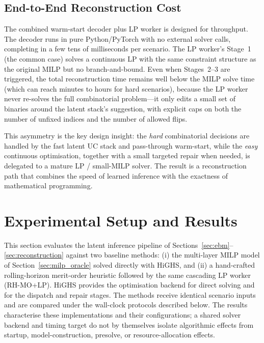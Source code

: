 \documentclass{article}
\begin{document}
\subsection{End-to-End Reconstruction Cost}
\label{sec:reconstruction_cost}

The combined warm-start decoder plus LP worker is designed for throughput. The decoder runs in pure Python/PyTorch with no external solver calls, completing in a few tens of milliseconds per scenario. The LP worker's Stage~1 (the common case) solves a continuous LP with the same constraint structure as the original MILP but no branch-and-bound. Even when Stages~2--3 are triggered, the total reconstruction time remains well below the MILP solve time (which can reach minutes to hours for hard scenarios), because the LP worker never re-solves the full combinatorial problem---it only edits a small set of binaries around the latent stack's suggestion, with explicit caps on both the number of unfixed indices and the number of allowed flips.

This asymmetry is the key design insight: the \emph{hard} combinatorial decisions are handled by the fast latent UC stack and pass-through warm-start, while the \emph{easy} continuous optimisation, together with a small targeted repair when needed, is delegated to a mature LP / small-MILP solver. The result is a reconstruction path that combines the speed of learned inference with the exactness of mathematical programming.




\section{Experimental Setup and Results}
\label{sec:experiments}

This section evaluates the latent inference pipeline of Sections~\ref{sec:ebm}--\ref{sec:reconstruction} against two baseline methods: (i) the multi-layer MILP model of Section~\ref{sec:milp_oracle} solved directly with HiGHS, and (ii) a hand-crafted rolling-horizon merit-order heuristic followed by the same cascading LP worker (RH-MO+LP). HiGHS provides the optimisation backend for direct solving and for the dispatch and repair stages. The methods receive identical scenario inputs and are compared under the wall-clock protocols described below. The results characterise these implementations and their configurations; a shared solver backend and timing target do not by themselves isolate algorithmic effects from startup, model-construction, presolve, or resource-allocation effects.
\end{document}
